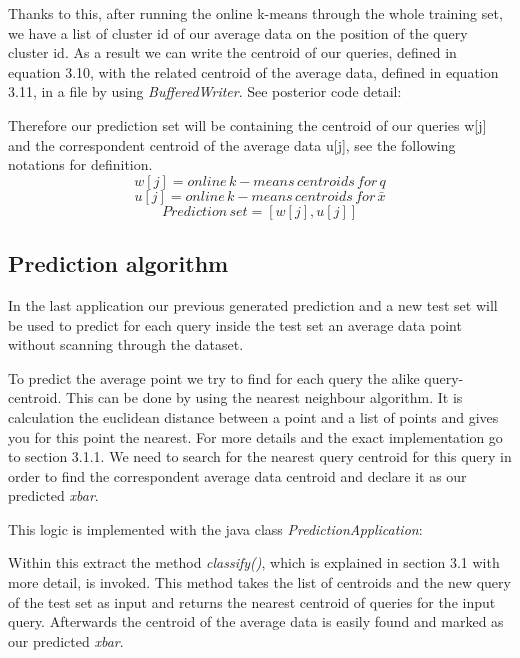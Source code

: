 \documentclass{lmproj}
\begin{document}
Thanks to this, after running the online k-means through the whole training set, we have a list of cluster id of our average data on the position of the query cluster id. As a result we can write the centroid of our queries, defined in equation 3.10, with the related centroid of the average data, defined in equation 3.11, in a file by using \textit{BufferedWriter}. See posterior code detail:


Therefore our prediction set will be containing the centroid of our queries w[j] and the correspondent centroid of the average data u[j], see the following notations for definition.
\begin{equation}
w[j]= online\,k-means\,centroids\,for\,q
\end{equation}
\begin{equation}
u[j]= online\,k-means\,centroids\,for\,\bar{x}
\end{equation}
\begin{equation}
Prediction\,set=[w[j],u[j]]
\end{equation}

\subsection{Prediction algorithm}

In the last application our previous generated prediction and a new test set will be used to predict for each query inside the test set an average data point without scanning through the dataset.

To predict the average point we try to find for each query the alike query-centroid. This can be done by using the nearest neighbour algorithm. It is calculation the euclidean distance between a point and a list of points and gives you for this point the nearest. For more details and the exact implementation go to section 3.1.1. We need to search for the nearest query centroid for this query in order to find the correspondent average data centroid and declare it as our predicted \textit{xbar}.  

This logic is implemented with the java class \textit{PredictionApplication}:


Within this extract the method \textit{classify()}, which is explained in section 3.1 with more detail, is invoked. This method takes the list of centroids and the new query of the test set as input and returns the nearest centroid of queries for the input query. Afterwards the centroid of the average data is easily found and marked as our predicted \textit{xbar}.
\end{document}
